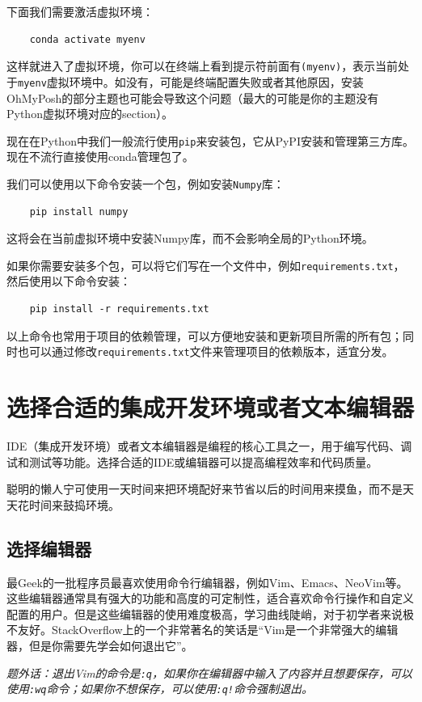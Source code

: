 \documentclass[../main.tex]{subfiles}
\begin{document}
下面我们需要激活虚拟环境：
\begin{verbatim}
    conda activate myenv
\end{verbatim}
这样就进入了虚拟环境，你可以在终端上看到提示符前面有\texttt{(myenv)}，表示当前处于\texttt{myenv}虚拟环境中。如没有，可能是终端配置失败或者其他原因，安装OhMyPosh的部分主题也可能会导致这个问题（最大的可能是你的主题没有Python虚拟环境对应的section）。

现在在Python中我们一般流行使用\texttt{pip}来安装包，它从PyPI安装和管理第三方库。现在不流行直接使用conda管理包了。

我们可以使用以下命令安装一个包，例如安装\texttt{Numpy}库：
\begin{verbatim}
    pip install numpy
\end{verbatim}
这将会在当前虚拟环境中安装Numpy库，而不会影响全局的Python环境。

如果你需要安装多个包，可以将它们写在一个文件中，例如\texttt{requirements.txt}，然后使用以下命令安装：
\begin{verbatim}
    pip install -r requirements.txt
\end{verbatim}
以上命令也常用于项目的依赖管理，可以方便地安装和更新项目所需的所有包；同时也可以通过修改\texttt{requirements.txt}文件来管理项目的依赖版本，适宜分发。

\section{选择合适的集成开发环境或者文本编辑器}

IDE（集成开发环境）或者文本编辑器是编程的核心工具之一，用于编写代码、调试和测试等功能。选择合适的IDE或编辑器可以提高编程效率和代码质量。

聪明的懒人宁可使用一天时间来把环境配好来节省以后的时间用来摸鱼，而不是天天花时间来鼓捣环境。

\subsection{选择编辑器}

最Geek的一批程序员最喜欢使用命令行编辑器，例如Vim、Emacs、NeoVim等。这些编辑器通常具有强大的功能和高度的可定制性，适合喜欢命令行操作和自定义配置的用户。但是这些编辑器的使用难度极高，学习曲线陡峭，对于初学者来说极不友好。StackOverflow上的一个非常著名的笑话是“Vim是一个非常强大的编辑器，但是你需要先学会如何退出它”。

\textit{题外话：退出Vim的命令是\texttt{:q}，如果你在编辑器中输入了内容并且想要保存，可以使用\texttt{:wq}命令；如果你不想保存，可以使用\texttt{:q!}命令强制退出。}
\end{document}
